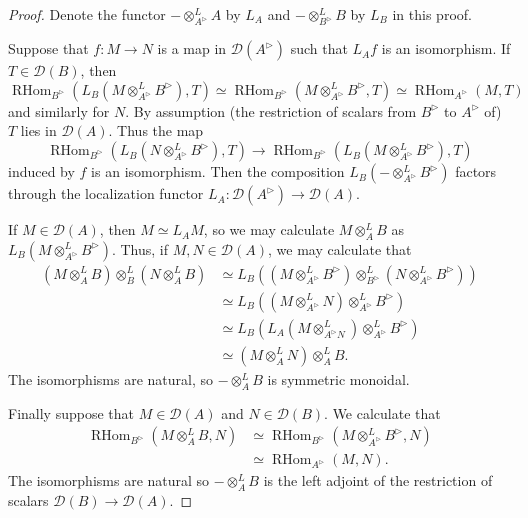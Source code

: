 \documentclass{article}
\theoremstyle{plain}
\theoremstyle{definition}
\theoremstyle{remark}
\DeclareMathOperator{\rhom}{RHom}
\newcommand{\dten}{\otimes ^{L}}
\newcommand{\huflag}{\triangleright}
\newcommand{\D}{\mathcal{D}}
\begin{document}
\begin{proof}
Denote the functor $ -\dten _{A ^{\huflag}} A $ by $ L _{A} $ and $ -\dten _{B ^{\huflag}} B $ by $ L _{B} $ in this proof.

Suppose that $ f: M\to N $ is a map in $ \D (A ^{\huflag}) $ such that $ L _{A} f $ is an isomorphism.
If $ T\in \D (B) $, then
\begin{equation*}
\rhom _{B ^{\huflag}}(L _{B}(M\dten _{A ^{\huflag}} B ^{\huflag}), T)\simeq
\rhom _{B ^{\huflag}}(M\dten _{A ^{\huflag}} B ^{\huflag}, T)\simeq 
\rhom _{A ^{\huflag}}(M, T)
\end{equation*}
and similarly for $ N $. By assumption (the restriction of scalars from $ B ^{\huflag} $ to $ A ^{\huflag} $ of) $ T $ lies in $ \D (A) $.
Thus the map
\begin{equation*}
\rhom _{B ^{\huflag}}(L _{B}(N\dten _{A ^{\huflag}} B ^{\huflag}), T)\to \rhom _{B ^{\huflag}}(L _{B}(M\dten _{A ^{\huflag}} B ^{\huflag}), T)
\end{equation*}
induced by $ f $ is an isomorphism.
Then the composition $ L _{B} (-\dten _{A ^{\huflag}} B ^{\huflag}) $ factors through the localization functor $ L _{A}: \D (A ^{\huflag})\to \D (A) $.

If $ M\in \D (A) $, then $ M\simeq L _{A} M $,
so we may calculate $ M \dten _{A} B $ as $ L _{B}(M \dten _{A ^{\huflag}} B ^{\huflag}) $.
Thus, if $ M,N\in \D (A) $, we may calculate that
\begin{align*}
(M\dten _{A} B)\dten _{B} (N\dten _{A} B)
&\simeq L _{B} ( (M \dten _{A ^{\huflag}} B ^{\huflag}) \dten _{B ^{\huflag}} (N \dten _{A ^{\huflag}} B ^{\huflag}))\\
&\simeq L _{B} ( (M \dten _{A ^{\huflag}} N) \dten _{A ^{\huflag}} B ^{\huflag} )\\
&\simeq L _{B} ( L _{A}(M \dten _{A ^{\huflag} N}) \dten _{A ^{\huflag}} B ^{\huflag})\\
&\simeq (M\dten _{A} N) \dten _{A} B.
\end{align*}
The isomorphisms are natural, so $ -\dten _{A} B $ is symmetric monoidal.

Finally suppose that $ M\in \D (A) $ and $ N \in \D (B) $. We calculate that
\begin{align*}
\rhom _{B ^{\huflag}}(M \dten _{A} B, N)
&\simeq \rhom _{B ^{\huflag}}(M \dten _{A ^{\huflag}} B ^{\huflag}, N)\\
&\simeq \rhom _{A ^{\huflag}}(M, N).
\end{align*}
The isomorphisms are natural so $ -\dten _{A} B $ is the left adjoint of the restriction of scalars $ \D (B)\to \D (A) $.
\end{proof}
\end{document}
